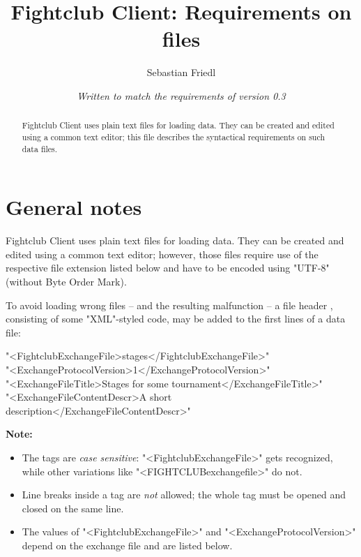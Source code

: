 \documentclass[11pt]{ltxdoc}
\title{\bfseries Fightclub Client: Requirements on files}
\author{Sebastian Friedl}
\date{\itshape Written to match the requirements of version 0.3}
\def\highlight#1{%
    \colorbox{red!12}{#1}%
    \index{\textsf{#1}}}
\begin{document}
    \maketitle
    
    \begin{abstract}\noindent
        Fightclub Client uses plain text files for loading data. They can be created and edited using a common text editor; this file describes the syntactical requirements on such data files.
    \end{abstract}

    \tableofcontents
    
    
    
    
    
    
    
    \clearpage
    \section{General notes}
    Fightclub Client uses plain text files for loading data. They can be created and edited using a common text editor; however, those files require use of the respective file extension listed below and have to be encoded using "UTF-8" (without Byte Order Mark).

    \medskip
    To avoid loading wrong files -- and the resulting malfunction -- a \highlight{file header}, consisting of some "XML"-styled code, may be added to the first lines of a data file:
    
    \smallskip
    "<FightclubExchangeFile>stages</FightclubExchangeFile>" \\
    "<ExchangeProtocolVersion>1</ExchangeProtocolVersion>" \\
    "<ExchangeFileTitle>Stages for some tournament</ExchangeFileTitle>" \\
    "<ExchangeFileContentDescr>A short description</ExchangeFileContentDescr>"
    
    \bigskip
    \textbf{Note:}
    \begin{itemize}
        \item
            The tags are \textit{case sensitive}: "<FightclubExchangeFile>" gets recognized, while other variations like "<FIGHTCLUBexchangefile>" do not.
        \item
            Line breaks inside a tag are \textit{not} allowed; the whole tag must be opened and closed on the same line.
        
        \item
            The values of "<FightclubExchangeFile>" and "<ExchangeProtocolVersion>" depend on the exchange file and are listed below.
    \end{itemize} 
    
\end{document}
